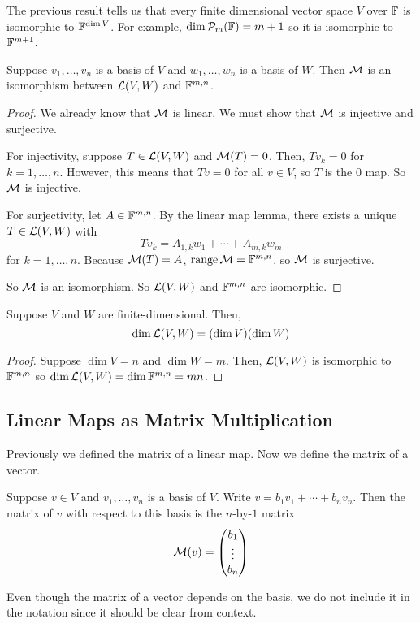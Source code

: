 The previous result tells us that every finite dimensional vector space $V$ over $\mathbb F$ is isomorphic to $\mathbb F^{\dim V}$. For example, $\dim \mathcal{P}_m(\mathbb F) = m+1$ so it is isomorphic to $\mathbb F^{m+1}$.

\begin{theorem} \label{matrix_isomorphism}
    Suppose $v_1, \dots, v_n$ is a basis of $V$ and $w_1, \dots, w_n$ is a basis of $W$. Then $\mathcal{M}$ is an isomorphism between $\mathcal{L}(V,W)$ and $\mathbb F^{m,n}$.
\end{theorem}
\begin{proof} 
    We already know that $\mathcal{M}$ is linear. We must show that $\mathcal{M}$ is injective and surjective.

    For injectivity, suppose $T\in\mathcal{L}(V,W)$ and $\mathcal{M}(T) = 0$. Then, $Tv_k = 0$ for $k = 1,\dots, n$. However, this means that $Tv = 0$ for all $v\in V$, so $T$ is the $0$ map. So $\mathcal{M}$ is injective.

    For surjectivity, let $A \in \mathbb F^{m,n}$. By the linear map lemma, there exists a unique $T\in\mathcal{L}(V,W)$ with
    \[ Tv_k = A_{1,k}w_1 + \cdots + A_{m, k}w_m \]
    for $k= 1,\dots, n$. Because $\mathcal{M}(T) = A$, $\operatorname{range} \mathcal{M} = \mathbb F^{m,n}$, so $\mathcal{M}$ is surjective.

    So $\mathcal{M}$ is an isomorphism. So $\mathcal{L}(V,W)$ and $\mathbb F^{m,n}$ are isomorphic.
\end{proof}
\begin{theorem}
    Suppose $V$ and $W$ are finite-dimensional. Then,
    \[ \dim\mathcal{L}(V,W) = (\dim V)(\dim W) \]
\end{theorem}
\begin{proof}
    Suppose $\dim V = n$ and $\dim W = m$. Then, $\mathcal{L}(V,W)$ is isomorphic to $\mathbb F^{m,n}$ so $\dim \mathcal{L}(V,W) = \dim \mathbb F^{m,n} = mn$.
\end{proof}
\subsection*{Linear Maps as Matrix Multiplication}
Previously we defined the matrix of a linear map. Now we define the matrix of a vector.
\begin{definition}
    Suppose $v\in V$ and $v_1, \dots, v_n$ is a basis of $V$. Write $v = b_1v_1 + \cdots + b_nv_n$. Then the matrix of $v$ with respect to this basis is the $n$-by-$1$ matrix
    \[ \mathcal{M}(v) = \begin{pmatrix} b_1 \\ \vdots \\ b_n \end{pmatrix} \]
\end{definition}
Even though the matrix of a vector depends on the basis, we do not include it in the notation since it should be clear from context.

